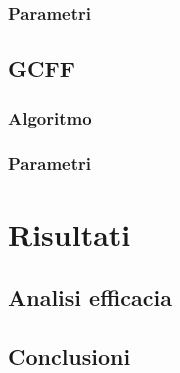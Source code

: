 \documentclass[8pt,twocolumn]{article}
\begin{document}
	\subsubsection{Parametri}
	\subsection{GCFF}
    \subsubsection{Algoritmo}
	\subsubsection{Parametri}
	\section{Risultati}
	\subsection{Analisi efficacia}
	\subsection{Conclusioni}
	
	
	
	\newpage
	\onecolumn
	
	
\end{document}
